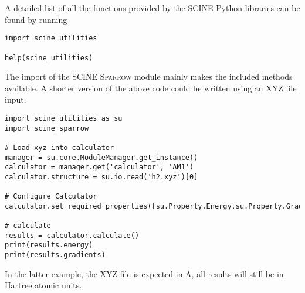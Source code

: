 \documentclass[]{tufte-book}
\begin{document}
A detailed list of all the functions provided by the \textsc{SCINE} Python libraries can be found by running
\begin{verbatim}
import scine_utilities

help(scine_utilities)
\end{verbatim}
The import of the SCINE \textsc{Sparrow} module mainly makes the included methods available.
A shorter version of the above code could be written using an XYZ file input.
\begin{verbatim}
import scine_utilities as su
import scine_sparrow

# Load xyz into calculator
manager = su.core.ModuleManager.get_instance()
calculator = manager.get('calculator', 'AM1')
calculator.structure = su.io.read('h2.xyz')[0]

# Configure Calculator
calculator.set_required_properties([su.Property.Energy,su.Property.Gradients])

# calculate
results = calculator.calculate()
print(results.energy)
print(results.gradients)
\end{verbatim}
In the latter example, the XYZ file is expected in \AA{}, all results will still be in Hartree atomic units.
\end{document}
